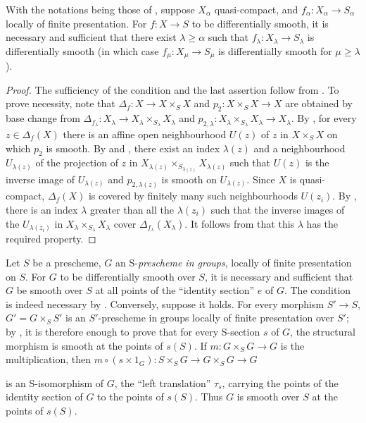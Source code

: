 \begin{corollary}[17.12.6]
\label{IV.17.12.6}
With the notations being those of , suppose $X_\alpha$ quasi-compact, and $f_\alpha:X_\alpha\to S_\alpha$ locally of finite presentation.
For $f:X\to S$ to be differentially smooth, it is necessary and sufficient that there exist $\lambda\geq\alpha$ such that $f_\lambda:X_\lambda\to S_\lambda$ is differentially smooth (in which case $f_\mu:X_\mu\to S_\mu$ is differentially smooth for $\mu\geq\lambda$).
\end{corollary}

\begin{proof}
The sufficiency of the condition and the last assertion follow from .
To prove necessity, note that $\Delta_f:X\to X\times_SX$ and $p_2:X\times_SX\to X$ are obtained by base change from
$\Delta_{f_\lambda}:X_\lambda\to X_\lambda\times_{S_\lambda}X_\lambda$ and
$p_{2,\lambda}:X_\lambda\times_{S_\lambda}X_\lambda\to X_\lambda$.
By , for every $z\in\Delta_f(X)$ there is an affine open neighbourhood $U(z)$ of $z$ in $X\times_SX$ on which $p_2$ is smooth.
By  and , there exist an index $\lambda(z)$ and a neighbourhood $U_{\lambda(z)}$ of the projection of $z$ in
$X_{\lambda(z)}\times_{S_{\lambda(z)}}X_{\lambda(z)}$ such that $U(z)$ is the inverse image of $U_{\lambda(z)}$ and $p_{2,\lambda(z)}$ is smooth on $U_{\lambda(z)}$.
Since $X$ is quasi-compact, $\Delta_f(X)$ is covered by finitely many such neighbourhoods $U(z_i)$.
By , there is an index $\lambda$ greater than all the $\lambda(z_i)$ such that the inverse images of the $U_{\lambda(z_i)}$ in $X_\lambda\times_{S_\lambda}X_\lambda$ cover $\Delta_{f_\lambda}(X_\lambda)$.
It follows from  that this $\lambda$ has the required property.
\end{proof}

\begin{example}[17.12.7]
\label{IV.17.12.7}
Let $S$ be a prescheme, $G$ an S-\emph{prescheme in groups}, locally of finite presentation on $S$.
For $G$ to be differentially smooth over $S$, it is necessary and sufficient that $G$ be smooth over $S$ at all points of the ``identity section'' $e$ of $G$.
The condition is indeed necessary by .
Conversely, suppose it holds.
For every morphism $S'\to S$, $G'=G\times_SS'$ is an $S'$-prescheme in groups locally of finite presentation over $S'$; by , it is therefore enough to prove that for every S-section $s$ of $G$, the structural morphism is smooth at the points of $s(S)$.
If $m:G\times_SG\to G$ is the multiplication, then
$m\circ(s\times1_G):S\times_SG\to G\times_SG\to G$


is an S-isomorphism of $G$, the ``left translation'' $\tau_s$, carrying the points of the identity section of $G$ to the points of $s(S)$.
Thus $G$ is smooth over $S$ at the points of $s(S)$.
\end{example}

